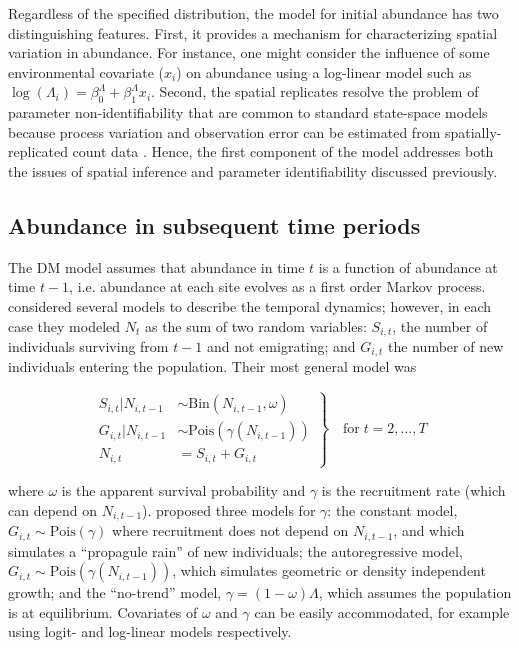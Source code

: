 \documentclass[12pt,english]{article}
\begin{document}
\begin{spacing}{1.9}
\begin{flushleft}
Regardless of the specified distribution, the model for initial
abundance has two distinguishing features. First, it provides a
mechanism for characterizing spatial variation in abundance. For
instance, one might consider the influence of some environmental
covariate ($x_i$) on abundance using a log-linear
model such as $\log(\Lambda_i) = \beta^{\Lambda}_0 +
\beta^{\Lambda}_1
x_{i}$. Second, the spatial
replicates resolve the
problem of parameter non-identifiability that are common to
standard state-space models because
process variation and observation error can be estimated from
spatially-replicated count data \citep{royle:2004biom}. Hence, the first component of
the model addresses both the issues of spatial inference and
parameter identifiability discussed previously.

\subsection*{Abundance in subsequent time periods}

The DM model assumes that abundance in time $t$ is a function of
abundance at time $t-1$, i.e. abundance at each site evolves as a
first order Markov process. 
\citet{dail_madsen:2011} considered several models to describe the temporal dynamics;
however, in each case they modeled $N_t$ as the sum of two random variables:
$S_{i,t}$, the number of individuals surviving from $t-1$ and not
emigrating; and $G_{i,t}$ the number of new individuals entering
the population. Their most general model was
\begin{linenomath*}
\begin{equation}
\left.\begin{aligned}
S_{i,t}|N_{i,t-1} &\sim \mathrm{Bin}(N_{i,t-1}, \omega) \\
G_{i,t}|N_{i,t-1} &\sim \mathrm{Pois}(\gamma(N_{i,t-1})) \\
N_{i,t} &= S_{i,t}+G_{i,t}
\end{aligned}\right\} \quad \text{for} \; t=2,\hdots,T
\label{eq:Nt}
\end{equation}
\end{linenomath*}
where $\omega$ is the apparent survival probability and $\gamma$
is the recruitment rate (which can depend on $N_{i,t-1}$).
\citet{dail_madsen:2011} proposed three
models for $\gamma$: the constant model,
$G_{i,t} \sim \mathrm{Pois}(\gamma)$ where recruitment does not
depend on $N_{i,t-1}$, and which simulates a ``propagule rain'' of new
individuals; the autoregressive model, $G_{i,t} \sim
\mathrm{Pois}(\gamma(N_{i,t-1}))$, which
simulates geometric or density independent growth; and the
``no-trend'' model, $\gamma = (1-\omega)\Lambda$, which assumes the
population is at equilibrium. Covariates of
$\omega$ and $\gamma$ can be easily accommodated, for example
using logit- and log-linear models respectively.



\end{flushleft}
\end{spacing}
\end{document}
